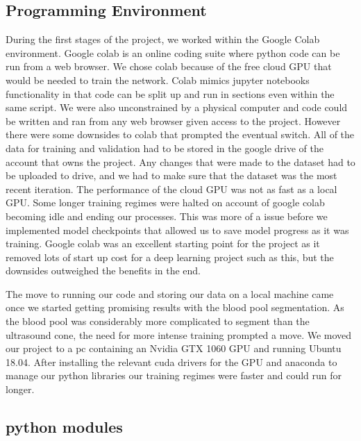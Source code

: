 \documentclass[12pt]{article}
\begin{document}
\subsection{Programming Environment}
During the first stages of the project, we worked within the Google Colab environment.
Google colab is an online coding suite where python code can be run from a web browser.
We chose colab because of the free cloud GPU that would be needed to train the network.
Colab mimics jupyter notebooks functionality in that code can be split up and run in sections even within the same script.
We were also unconstrained by a physical computer and code could be written and ran from any web browser given access to the project.
However there were some downsides to colab that prompted the eventual switch.
All of the data for training and validation had to be stored in the google drive of the account that owns the project.
Any changes that were made to the dataset had to be uploaded to drive, and we had to make sure that the dataset was the most recent iteration.
The performance of the cloud GPU was not as fast as a local GPU.
Some longer training regimes were halted on account of google colab becoming idle and ending our processes.
This was more of a issue before we implemented model checkpoints that allowed us to save model progress as it was training.
Google colab was an excellent starting point for the project as it removed lots of start up cost for a deep learning project such as this, but the downsides outweighed the benefits in the end.

The move to running our code and storing our data on a local machine came once we started getting promising results with the blood pool segmentation.
As the blood pool was considerably more complicated to segment than the ultrasound cone, the need for more intense training prompted a move.
We moved our project to a pc containing an Nvidia GTX 1060 GPU and running Ubuntu 18.04.
After installing the relevant cuda drivers for the GPU and anaconda to manage our python libraries our training regimes were faster and could run for longer.


\subsection{python modules}
\end{document}
